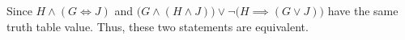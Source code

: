 \begin{solution}
    Since $H \wedge (G \iff J)$ and $\bigl(G \land (H \land J)\bigr)
    \lor
    \neg\bigl(H \implies (G \lor J)\bigr)$ have the same truth table value. 
    Thus, these two statements are equivalent. 

\end{solution}
